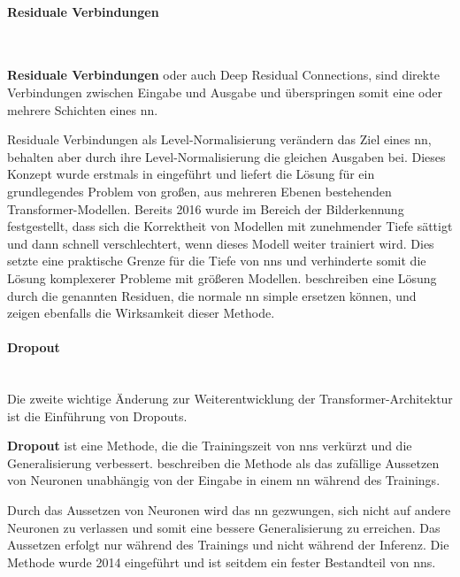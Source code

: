 \paragraph{Residuale Verbindungen}\mbox{} \\

\begin{definition}\label{def:residuale-verbindungen}
    \textbf{Residuale Verbindungen} oder auch Deep Residual Connections, sind direkte Verbindungen zwischen Eingabe und Ausgabe und überspringen somit eine oder mehrere Schichten eines \ac{nn}.
\end{definition}
Residuale Verbindungen als Level-Normalisierung verändern das Ziel eines \ac{nn}, behalten aber durch ihre Level-Normalisierung die gleichen Ausgaben bei.
Dieses Konzept wurde erstmals in \citet{deep_residual} eingeführt und liefert die Lösung für ein grundlegendes Problem von großen, aus mehreren Ebenen bestehenden Transformer-Modellen.
Bereits 2016 wurde im Bereich der Bilderkennung festgestellt, dass sich die Korrektheit von Modellen mit zunehmender Tiefe sättigt und dann schnell verschlechtert, wenn dieses Modell weiter trainiert wird.
Dies setzte eine praktische Grenze für die Tiefe von \ac{nn}s und verhinderte somit die Lösung komplexerer Probleme mit größeren Modellen.
\citet{deep_residual} beschreiben eine Lösung durch die genannten Residuen, die normale \ac{nn} simple ersetzen können, und zeigen ebenfalls die Wirksamkeit dieser Methode.\\

\paragraph{Dropout}\mbox{} \\

Die zweite wichtige Änderung zur Weiterentwicklung der Transformer-Architektur ist die Einführung von Dropouts.
\begin{definition}\label{def:dropout}
    \textbf{Dropout} ist eine Methode, die die Trainingszeit von \ac{nn}s verkürzt und die Generalisierung verbessert.
    \citet{dropout} beschreiben die Methode als das zufällige Aussetzen von Neuronen unabhängig von der Eingabe in einem \ac{nn} während des Trainings. 
\end{definition}
Durch das Aussetzen von Neuronen wird das \ac{nn} gezwungen, sich nicht auf andere Neuronen zu verlassen und somit eine bessere Generalisierung zu erreichen.
Das Aussetzen erfolgt nur während des Trainings und nicht während der Inferenz.
Die Methode wurde 2014 eingeführt und ist seitdem ein fester Bestandteil von \ac{nn}s.\\

